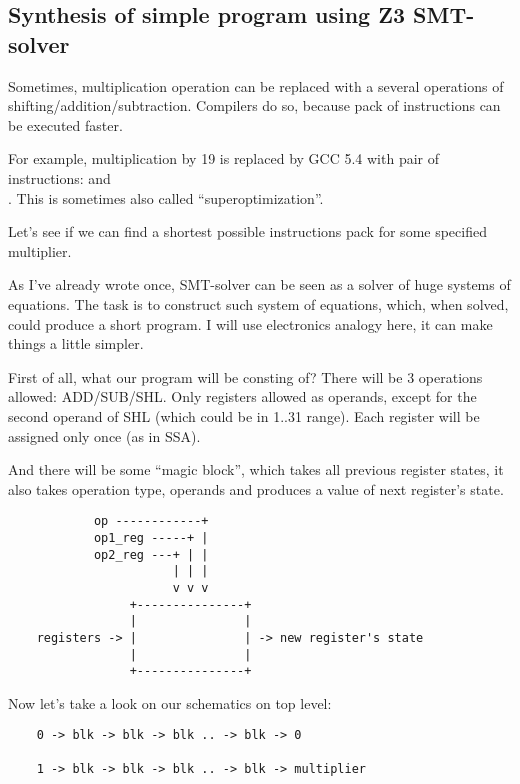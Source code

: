 \subsection{Synthesis of simple program using Z3 SMT-solver}
\label{synth_mult}

\renewcommand{\CURPATH}{synth/pgm/load}

Sometimes, multiplication operation can be replaced with a several operations of shifting/addition/subtraction.
Compilers do so, because pack of instructions can be executed faster.

For example, multiplication by 19 is replaced by GCC 5.4 with pair of instructions:  and\\
.
This is sometimes also called ``superoptimization''.

Let's see if we can find a shortest possible instructions pack for some specified multiplier.

As I've already wrote once, SMT-solver can be seen as a solver of huge systems of equations.
The task is to construct such system of equations, which, when solved, could produce a short program.
I will use electronics analogy here, it can make things a little simpler.

First of all, what our program will be consting of? There will be 3 operations allowed: ADD/SUB/SHL.
Only registers allowed as operands, except for the second operand of SHL (which could be in 1..31 range).
Each register will be assigned only once (as in \ac{SSA}).

And there will be some ``magic block'', which takes all previous register states, it also takes operation type,
operands and produces a value of next register's state.

\begin{lstlisting}
	        op ------------+
	        op1_reg -----+ |
	        op2_reg ---+ | |
	                   | | |
	                   v v v
	             +---------------+
	             |               |
	registers -> |               | -> new register's state
	             |               |
	             +---------------+
\end{lstlisting}

Now let's take a look on our schematics on top level:

\begin{lstlisting}
	0 -> blk -> blk -> blk .. -> blk -> 0

	1 -> blk -> blk -> blk .. -> blk -> multiplier
\end{lstlisting}


